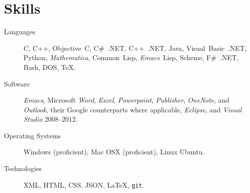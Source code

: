 \documentclass[11pt,letterpaper]{article}
\newcommand{\software}[1]{\textsl{#1}}
\begin{document}
\section*{Skills}
  \begin{description}
  \item[Languages] C, C++, Objective~C, C\#~.NET, C++~.NET, Java,
    Visual~Basic~.NET, Python, \software{Mathematica}, Common~Lisp,
    \software{Emacs}~Lisp, Scheme, F\#~.NET, Bash, DOS, \TeX.

  \item[Software] \software{Emacs}, Microsoft
    \software{Word}, \software{Excel}, \software{Powerpoint},
    \software{Publisher}, \software{OneNote}, and \software{Outlook},
    their Google counterparts where applicable, \software{Eclipse},
    and \software{Visual Studio} 2008--2012.

  \item[Operating Systems] Windows (proficient), Mac OSX (proficient),
    Linux Ubuntu.

  \item[Technologies] XML, HTML, CSS, JSON, \LaTeX{}, \texttt{git}.
  \end{description}
\end{document}
